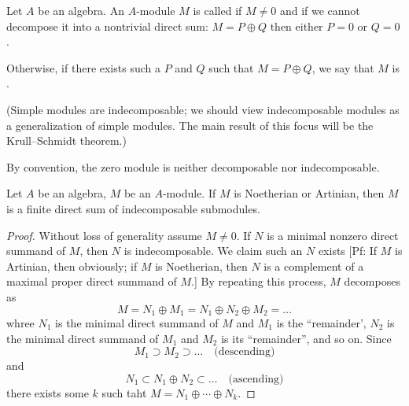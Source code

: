 

\begin{definition}
Let $A$ be an algebra. An $A$-module $M$ is called
 if $M\neq0$ and if we cannot decompose it into
a nontrivial direct sum: $M=P\oplus Q$ then either
$P=0$ or $Q=0$.

Otherwise, if there exists such a $P$ and $Q$ such that $M=P\oplus Q$,
we say that $M$ is .
\end{definition}

(Simple modules are indecomposable; we should view indecomposable
modules as a generalization of simple modules. The main result of this
focus will be the Krull--Schmidt theorem.)

\begin{caution}
By convention, the zero module is neither decomposable nor indecomposable.
\end{caution}

\begin{proposition}\label{prop:5.1}
Let $A$ be an algebra, $M$ be an $A$-module.
If $M$ is Noetherian or Artinian, then $M$ is a finite direct sum of
indecomposable submodules.
\end{proposition}

\begin{proof}
Without loss of generality assume $M\neq0$. If $N$ is a minimal
nonzero direct summand of $M$, then $N$ is indecomposable. We claim
such an $N$ exists [Pf: If $M$ is Artinian, then obviously; if $M$ is
Noetherian, then $N$ is a complement of a maximal proper direct
summand of $M$.]
By repeating this process, $M$ decomposes as
\begin{equation}
M=N_{1}\oplus M_{1}=N_{1}\oplus N_{2}\oplus M_{2}=\dots
\end{equation}
whree $N_{1}$ is the minimal direct summand of $M$ and $M_{1}$ is the
``remainder', $N_{2}$ is the minimal direct summand of $M_{1}$ and
$M_{2}$ is its ``remainder'', and so on. Since
\begin{equation}
M_{1}\supset M_{2}\supset\dots\quad\mbox{(descending)}
\end{equation}
and
\begin{equation}
N_{1}\subset N_{1}\oplus N_{2}\subset\dots\quad\mbox{(ascending)}
\end{equation}
there exists some $k$ such taht $M=N_{1}\oplus\cdots\oplus N_{k}$.
\end{proof}

